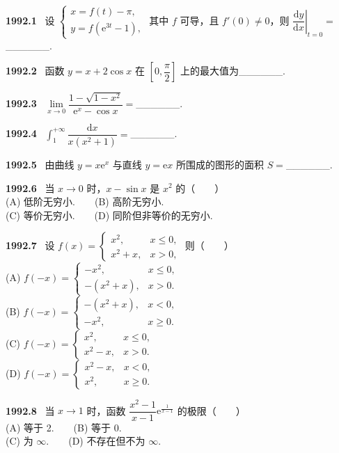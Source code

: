\documentclass[UTF8,12pt]{ctexart}
\newcommand{\qn}[1]{\textbf{\large #1}\ }
\begin{document}
\qn{1992.1}
设 $\begin{cases} x=f(t)-\pi, \\ y=f(\mathrm{e}^{3t}-1), \end{cases}$ 其中 $f$ 可导，且 $f'(0)\neq 0$，则 $\left.\dfrac{\mathrm{d}y}{\mathrm{d}x}\right|_{t=0}=$______.

\vfill
\newpage
\qn{1992.2}
函数 $y=x+2\cos x$ 在 $\left[0,\dfrac{\pi}{2}\right]$ 上的最大值为______.

\vfill
\newpage
\qn{1992.3}
$\lim\limits_{x\to0}\dfrac{1-\sqrt{1-x^2}}{\mathrm{e}^x-\cos x}=$______.

\vfill
\newpage
\qn{1992.4}
$\int_1^{+\infty}\dfrac{\mathrm{d}x}{x(x^2+1)}=$______.

\vfill
\newpage
\qn{1992.5}
由曲线 $y=x\mathrm{e}^x$ 与直线 $y=\mathrm{e}x$ 所围成的图形的面积 $S=$______.

\vfill
\newpage
\qn{1992.6}
当 $x\to0$ 时，$x-\sin x$ 是 $x^2$ 的（　　）
\\
\noindent (A) 低阶无穷小.　　(B) 高阶无穷小.
\\
\noindent (C) 等价无穷小.　　(D) 同阶但非等价的无穷小.

\vfill
\newpage
\qn{1992.7}
设 $f(x)=\begin{cases} x^2, & x\leqslant 0, \\ x^2+x, & x>0, \end{cases}$ 则（　　）
\\
\noindent (A) $f(-x)=\begin{cases} -x^2, & x\leqslant 0, \\ -(x^2+x), & x>0. \end{cases}$
\\
\noindent (B) $f(-x)=\begin{cases} -(x^2+x), & x<0, \\ -x^2, & x\geqslant 0. \end{cases}$
\\
\noindent (C) $f(-x)=\begin{cases} x^2, & x\leqslant 0, \\ x^2-x, & x>0. \end{cases}$
\\
\noindent (D) $f(-x)=\begin{cases} x^2-x, & x<0, \\ x^2, & x\geqslant 0. \end{cases}$

\vfill
\newpage
\qn{1992.8}
当 $x\to1$ 时，函数 $\dfrac{x^2-1}{x-1}\mathrm{e}^{\frac{1}{x-1}}$ 的极限（　　）
\\
\noindent (A) 等于 2.　　(B) 等于 0.
\\
\noindent (C) 为 $\infty$.　　(D) 不存在但不为 $\infty$.
\end{document}

